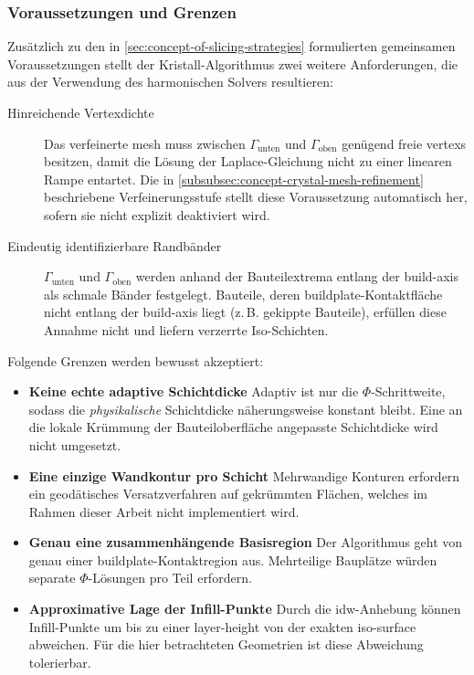             \subsubsection{Voraussetzungen und Grenzen}\label{subsubsec:concept-crystal-assumptions-limits}
                Zusätzlich zu den in \cref{sec:concept-of-slicing-strategies} formulierten gemeinsamen Voraussetzungen stellt der Kristall-Algorithmus zwei weitere Anforderungen, die aus der Verwendung des harmonischen Solvers resultieren:

                \begin{description}
                    \item[Hinreichende Vertexdichte]
                        Das verfeinerte \gls{mesh} muss zwischen $\Gamma_\text{unten}$ und $\Gamma_\text{oben}$ genügend freie \glspl{vertex} besitzen, damit die Lösung der Laplace-Gleichung nicht zu einer linearen Rampe entartet.
                        Die in \cref{subsubsec:concept-crystal-mesh-refinement} beschriebene Verfeinerungsstufe stellt diese Voraussetzung automatisch her, sofern sie nicht explizit deaktiviert wird.
                    \item[Eindeutig identifizierbare Randbänder]
                        $\Gamma_\text{unten}$ und $\Gamma_\text{oben}$ werden anhand der Bauteilextrema entlang der \gls{build-axis} als schmale Bänder festgelegt.
                        Bauteile, deren \gls{buildplate}-Kontaktfläche nicht entlang der \gls{build-axis} liegt (z.\,B. gekippte Bauteile), erfüllen diese Annahme nicht und liefern verzerrte Iso-Schichten.
                \end{description}

                Folgende Grenzen werden bewusst akzeptiert:
                \begin{itemize}
                    \item \textbf{Keine echte adaptive Schichtdicke}
                        Adaptiv ist nur die $\Phi$-Schrittweite, sodass die \emph{physikalische} Schichtdicke näherungsweise konstant bleibt.
                        Eine an die lokale Krümmung der Bauteiloberfläche angepasste Schichtdicke wird nicht umgesetzt.
                    \item \textbf{Eine einzige Wandkontur pro Schicht}
                        Mehrwandige Konturen erfordern ein geodätisches Versatzverfahren auf gekrümmten Flächen, welches im Rahmen dieser Arbeit nicht implementiert wird.
                    \item \textbf{Genau eine zusammenhängende Basisregion}
                        Der Algorithmus geht von genau einer \gls{buildplate}-Kontaktregion aus.
                        Mehrteilige Bauplätze würden separate $\Phi$-Lösungen pro Teil erfordern.
                    \item \textbf{Approximative Lage der Infill-Punkte}
                        Durch die \gls{idw}-Anhebung können Infill-Punkte um bis zu einer \gls{layer-height} von der exakten \gls{iso-surface} abweichen.
                        Für die hier betrachteten Geometrien ist diese Abweichung tolerierbar.
                \end{itemize}

